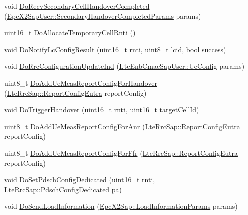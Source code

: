 \begin{DoxyCompactItemize}
\item 
void \hyperlink{classns3_1_1LteEnbRrc_a0e867434fe0f47979e7dc1a35f5d37cc}{Do\+Recv\+Secondary\+Cell\+Handover\+Completed} (\hyperlink{structns3_1_1EpcX2Sap_1_1SecondaryHandoverCompletedParams}{Epc\+X2\+Sap\+User\+::\+Secondary\+Handover\+Completed\+Params} params)
\item 
uint16\+\_\+t \hyperlink{classns3_1_1LteEnbRrc_ad23ce13b9f031646da6f1ccd9c6cddf7}{Do\+Allocate\+Temporary\+Cell\+Rnti} ()
\item 
void \hyperlink{classns3_1_1LteEnbRrc_ab19177144be815c471e18321b5123f73}{Do\+Notify\+Lc\+Config\+Result} (uint16\+\_\+t rnti, uint8\+\_\+t lcid, bool success)
\item 
void \hyperlink{classns3_1_1LteEnbRrc_a88e583e7d72ccdf0367eacfc8ed94490}{Do\+Rrc\+Configuration\+Update\+Ind} (\hyperlink{structns3_1_1LteEnbCmacSapUser_1_1UeConfig}{Lte\+Enb\+Cmac\+Sap\+User\+::\+Ue\+Config} params)
\item 
uint8\+\_\+t \hyperlink{classns3_1_1LteEnbRrc_a6d91ee7d614832f0a49b056e14cfda9a}{Do\+Add\+Ue\+Meas\+Report\+Config\+For\+Handover} (\hyperlink{structns3_1_1LteRrcSap_1_1ReportConfigEutra}{Lte\+Rrc\+Sap\+::\+Report\+Config\+Eutra} report\+Config)
\item 
void \hyperlink{classns3_1_1LteEnbRrc_af49f5004e84050871c872de398f4defe}{Do\+Trigger\+Handover} (uint16\+\_\+t rnti, uint16\+\_\+t target\+Cell\+Id)
\item 
uint8\+\_\+t \hyperlink{classns3_1_1LteEnbRrc_a7b8e08acbb8b335fe327a7c543f538f4}{Do\+Add\+Ue\+Meas\+Report\+Config\+For\+Anr} (\hyperlink{structns3_1_1LteRrcSap_1_1ReportConfigEutra}{Lte\+Rrc\+Sap\+::\+Report\+Config\+Eutra} report\+Config)
\item 
uint8\+\_\+t \hyperlink{classns3_1_1LteEnbRrc_a2ab1702c7f51c4768a78d5a4d2a5eaf9}{Do\+Add\+Ue\+Meas\+Report\+Config\+For\+Ffr} (\hyperlink{structns3_1_1LteRrcSap_1_1ReportConfigEutra}{Lte\+Rrc\+Sap\+::\+Report\+Config\+Eutra} report\+Config)
\item 
void \hyperlink{classns3_1_1LteEnbRrc_a0e84130f77df4f32f988fe0c513d00da}{Do\+Set\+Pdsch\+Config\+Dedicated} (uint16\+\_\+t rnti, \hyperlink{structns3_1_1LteRrcSap_1_1PdschConfigDedicated}{Lte\+Rrc\+Sap\+::\+Pdsch\+Config\+Dedicated} pa)
\item 
void \hyperlink{classns3_1_1LteEnbRrc_a557bbbc9b894c9ea29a18fdd89399850}{Do\+Send\+Load\+Information} (\hyperlink{structns3_1_1EpcX2Sap_1_1LoadInformationParams}{Epc\+X2\+Sap\+::\+Load\+Information\+Params} params)
\item 

\end{DoxyCompactItemize}
